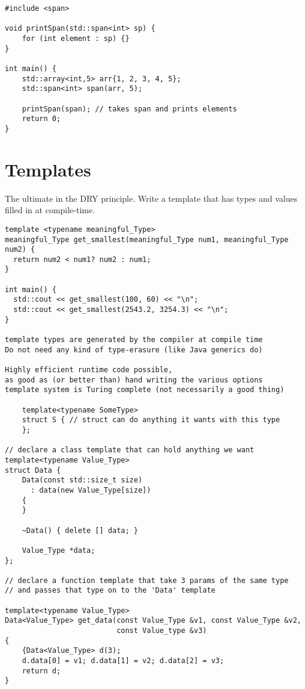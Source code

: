 \begin{verbatim}
#include <span>

void printSpan(std::span<int> sp) {
    for (int element : sp) {}
}

int main() {
    std::array<int,5> arr{1, 2, 3, 4, 5};
    std::span<int> span(arr, 5);

    printSpan(span); // takes span and prints elements
    return 0;
}
\end{verbatim}

\section{Templates}

The ultimate in the DRY principle. Write a template that has types and values filled in at compile-time.

\begin{verbatim}
template <typename meaningful_Type>
meaningful_Type get_smallest(meaningful_Type num1, meaningful_Type num2) {
  return num2 < num1? num2 : num1;
}

int main() {
  std::cout << get_smallest(100, 60) << "\n";
  std::cout << get_smallest(2543.2, 3254.3) << "\n";
}

template types are generated by the compiler at compile time
Do not need any kind of type-erasure (like Java generics do)

Highly efficient runtime code possible, 
as good as (or better than) hand writing the various options
template system is Turing complete (not necessarily a good thing)

    template<typename SomeType>
    struct S { // struct can do anything it wants with this type
    };

// declare a class template that can hold anything we want
template<typename Value_Type>
struct Data {
    Data(const std::size_t size)
      : data(new Value_Type[size])
    {
    }

    ~Data() { delete [] data; }

    Value_Type *data;
};

// declare a function template that take 3 params of the same type
// and passes that type on to the 'Data' template

template<typename Value_Type>
Data<Value_Type> get_data(const Value_Type &v1, const Value_Type &v2,
                          const Value_type &v3)
{
    {Data<Value_Type> d(3);
    d.data[0] = v1; d.data[1] = v2; d.data[2] = v3;
    return d;
}
\end{verbatim}


